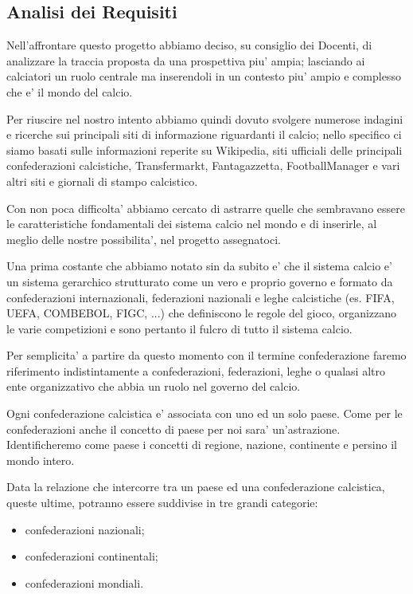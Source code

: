 \newpage
\subsection{Analisi dei Requisiti}

Nell'affrontare questo progetto abbiamo deciso, su consiglio dei Docenti, di analizzare
la traccia proposta da una prospettiva piu' ampia; lasciando ai calciatori un ruolo centrale
ma inserendoli in un contesto piu' ampio e complesso che e' il mondo del calcio.

Per riuscire nel nostro intento abbiamo quindi dovuto svolgere numerose indagini e ricerche
sui principali siti di informazione riguardanti il calcio; nello specifico ci siamo basati sulle
informazioni reperite su Wikipedia, siti ufficiali delle principali confederazioni calcistiche,
Transfermarkt, Fantagazzetta, FootballManager e vari altri siti e giornali di stampo calcistico.

Con non poca difficolta' abbiamo cercato di astrarre quelle che sembravano essere le
caratteristiche fondamentali dei sistema calcio nel mondo e di inserirle, al meglio delle nostre
possibilita', nel progetto assegnatoci.

\bigskip
\bigskip

Una prima costante che abbiamo notato sin da subito e' che il sistema calcio e' un sistema
gerarchico strutturato come un vero e proprio governo e formato da confederazioni internazionali,
federazioni nazionali e leghe calcistiche (es. FIFA, UEFA, COMBEBOL, FIGC, ...) che definiscono
le regole del gioco, organizzano le varie competizioni e sono pertanto il fulcro di
tutto il sistema calcio.

Per semplicita' a partire da questo momento con il termine confederazione faremo
riferimento indistintamente a confederazioni, federazioni, leghe o qualasi altro ente
organizzativo che abbia un ruolo nel governo del calcio.

Ogni confederazione calcistica e' associata con uno ed un solo paese.\newline
Come per le confederazioni anche il concetto di paese per noi sara' un'astrazione.
Identificheremo come paese i concetti di regione, nazione, continente e persino il mondo intero.

Data la relazione che intercorre tra un paese ed una confederazione calcistica, queste ultime,
potranno essere suddivise in tre grandi categorie:
\begin{itemize}
	\item confederazioni nazionali;
	\item confederazioni continentali;
	\item confederazioni mondiali.
\end{itemize}

